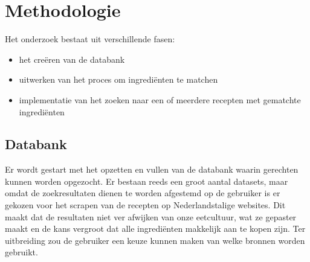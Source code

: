 \documentclass{hogent-article}
\begin{document}

\section{Methodologie}%
\label{sec:methodologie}


Het onderzoek bestaat uit verschillende fasen:
\begin{itemize}
    \item het creëren van de databank
    \item uitwerken van het proces om ingrediënten te matchen
    \item implementatie van het zoeken naar een of meerdere recepten met gematchte ingrediënten
\end{itemize}

\subsection{Databank}%

Er wordt gestart met het opzetten en vullen van de databank waarin gerechten kunnen worden opgezocht. Er bestaan reeds een groot aantal datasets, maar omdat de zoekresultaten dienen te worden afgestemd op de gebruiker is er gekozen voor het scrapen van de recepten op Nederlandstalige websites. Dit maakt dat de resultaten niet ver afwijken van onze eetcultuur, wat ze gepaster maakt en de kans vergroot dat alle ingrediënten makkelijk aan te kopen zijn. Ter  uitbreiding zou de gebruiker een keuze kunnen maken van welke bronnen worden gebruikt.
\end{document}

